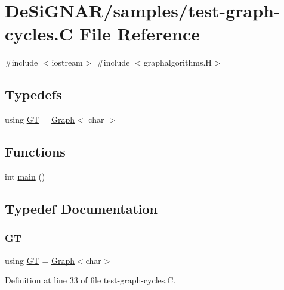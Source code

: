 \hypertarget{test-graph-cycles_8_c}{}\section{De\+Si\+G\+N\+A\+R/samples/test-\/graph-\/cycles.C File Reference}
\label{test-graph-cycles_8_c}
{\ttfamily \#include $<$iostream$>$}\newline
{\ttfamily \#include $<$graphalgorithms.\+H$>$}\newline
\subsection*{Typedefs}
\begin{DoxyCompactItemize}
\item 
using \hyperlink{test-graph-cycles_8_c_a867adda87f9db275997db57644adc40f}{GT} = \hyperlink{class_designar_1_1_graph}{Graph}$<$ char $>$
\end{DoxyCompactItemize}
\subsection*{Functions}
\begin{DoxyCompactItemize}
\item 
int \hyperlink{test-graph-cycles_8_c_ae66f6b31b5ad750f1fe042a706a4e3d4}{main} ()
\end{DoxyCompactItemize}


\subsection{Typedef Documentation}
\mbox{\label{test-graph-cycles_8_c_a867adda87f9db275997db57644adc40f}} 
\subsubsection{\texorpdfstring{GT}{GT}}
{\footnotesize\ttfamily using \hyperlink{demo-buildgraph_8_c_a3001c40d2c31ca87ed96cd7d1334a55e}{GT} =  \hyperlink{class_designar_1_1_graph}{Graph}$<$char$>$}



Definition at line 33 of file test-\/graph-\/cycles.\+C.



